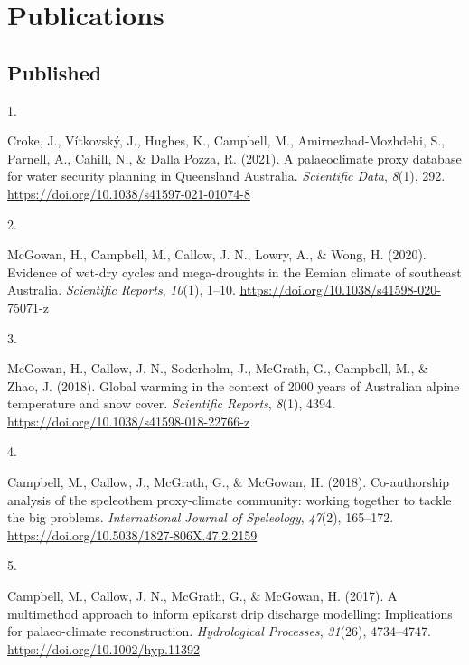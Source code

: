 \documentclass[11pt,a4paper,]{moderncv}
\newlength{\csllabelwidth}
\newcommand{\CSLLeftMargin}[1]{\parbox[t]{\csllabelwidth}{#1}}
\newcommand{\CSLRightInline}[1]{\parbox[t]{\linewidth - \csllabelwidth}{#1}}
\begin{document}
\hypertarget{publications}{%
\section{Publications}\label{publications}}

\hypertarget{published}{%
\subsection{Published}\label{published}}

\hypertarget{bibliography}{}
\leavevmode\hypertarget{ref-croke_palaeoclimate_2021}{}%
\CSLLeftMargin{1. }
\CSLRightInline{Croke, J., Vítkovský, J., Hughes, K., Campbell, M.,
Amirnezhad-Mozhdehi, S., Parnell, A., Cahill, N., \& Dalla Pozza, R.
(2021). A palaeoclimate proxy database for water security planning in
Queensland Australia. \emph{Scientific Data}, \emph{8}(1), 292.
\url{https://doi.org/10.1038/s41597-021-01074-8}}

\leavevmode\hypertarget{ref-mcgowan_evidence_2020}{}%
\CSLLeftMargin{2. }
\CSLRightInline{McGowan, H., Campbell, M., Callow, J. N., Lowry, A., \&
Wong, H. (2020). Evidence of wet-dry cycles and mega-droughts in the
Eemian climate of southeast Australia. \emph{Scientific Reports},
\emph{10}(1), 1--10. \url{https://doi.org/10.1038/s41598-020-75071-z}}

\leavevmode\hypertarget{ref-McGowan2018}{}%
\CSLLeftMargin{3. }
\CSLRightInline{McGowan, H., Callow, J. N., Soderholm, J., McGrath, G.,
Campbell, M., \& Zhao, J. (2018). Global warming in the context of 2000
years of Australian alpine temperature and snow cover. \emph{Scientific
Reports}, \emph{8}(1), 4394.
\url{https://doi.org/10.1038/s41598-018-22766-z}}

\leavevmode\hypertarget{ref-Campbell2018}{}%
\CSLLeftMargin{4. }
\CSLRightInline{Campbell, M., Callow, J., McGrath, G., \& McGowan, H.
(2018). Co-authorship analysis of the speleothem proxy-climate
community: working together to tackle the big problems.
\emph{International Journal of Speleology}, \emph{47}(2), 165--172.
\url{https://doi.org/10.5038/1827-806X.47.2.2159}}

\leavevmode\hypertarget{ref-Campbell2017}{}%
\CSLLeftMargin{5. }
\CSLRightInline{Campbell, M., Callow, J. N., McGrath, G., \& McGowan, H.
(2017). A multimethod approach to inform epikarst drip discharge
modelling: Implications for palaeo-climate reconstruction.
\emph{Hydrological Processes}, \emph{31}(26), 4734--4747.
\url{https://doi.org/10.1002/hyp.11392}}
\end{document}
